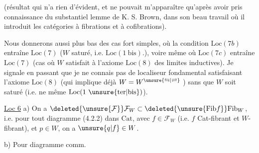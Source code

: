 (résultat qui n'a rien d'évident, et ne pouvait
m'apparaître qu'après avoir pris connaissance
du substantiel lemme de K. S. Brown,
dans son beau travail où il introduit les
catégories à fibrations et à cofibrations).

Nous donnerons aussi plus bas des cas
fort simples, où la condition $\mathrm{Loc}(7b)$ 
entraîne  $\mathrm{Loc}(7)$ ($W$  saturé, i.e.
$\mathrm{Loc}(1\ \mathrm{bis})$.), voire même où $\mathrm{Loc}(7c)$
entraîne $\mathrm{Loc}(7)$ (cas où $W$ satisfait à
l'axiome  $\mathrm{Loc}(8)$ des limites inductives).
Je signale en passant que je ne connais
pas de localiseur fondamental satisfaisant
l'axiome $\mathrm{Loc}(8)$ (qui implique déjà $W=W^{\unsure{\leftrightarrows|\rightleftarrows}}$ )
sans que $W$ soit  saturé \deleted{\unsure{(}} (i.e. ne
 même $\mathrm{Loc}(1\ \unsure{\mathrm{ter}|\mathrm{bis}})$).

\uline{Loc 6} \quad a)  On a $\deleted{\unsure{\mathcal F}}\mathcal F_W\subset\deleted{\unsure{\mathrm{Fib}f}}\mathrm{Fib}_W$, i.e. pour
tout diagramme  (4.2.2) dans $\mathrm{Cat}$,
avec $f\in\mathcal F_W$ (i.e. $f$ Cat-fibrant et  $W$-fibrant),
et $p\in W$, on a $\unsure{q|f}\in W$.

b) Pour  diagramme comm.
